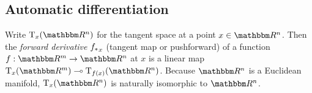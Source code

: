 \subsection{Automatic differentiation}

Write $\tangents_x(\RR^n)$ for the tangent space at a point $x \in \RR^n$. Then the \emph{forward derivative}
${f_{*}}_x$ (tangent map or pushforward) of a function $f: \RR^m \to \RR^n$ at $x$ is a linear map
$\tangents_x(\RR^m) \linearto \tangents_{f(x)}(\RR^n)$. Because $\RR^n$ is a Euclidean manifold,
$\tangents_x(\RR^n)$ is naturally isomorphic to $\RR^n$.
